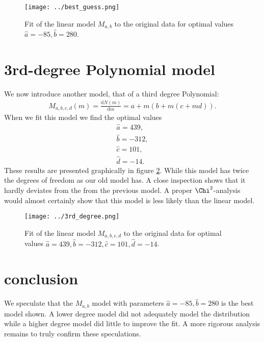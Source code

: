 \documentclass[notitlepage, 12pt, a4paper, twoside, titlepage]{article}
\begin{document}
\begin{figure}[h!]
  \texttt{[image: ../best\_guess.png]}
  \caption{Fit of the linear model $M_{a,b}$ to the original data for optimal values $\hat a = -85, \hat b = 280$.}
  \label{fig:best}
\end{figure}

\section{3rd-degree Polynomial model}
We now introduce another model, that of a third degree Polynomial:
\begin{align}
	M_{a,b,c,d}(m) = \frac{\text{d}N(m)}{\text{d}m} = a + m \left(b + m \left(c+md\right)\right).
\end{align}
 When we fit this model we find the optimal values
 \begin{align}
	 \hat a = 439,\\
	 \hat b = -312,\\
	 \hat c = 101,\\
	 \hat d = -14.
\end{align}
 These results are presented graphically in figure \ref{fig:3rd}.  While this model has twice the degrees of freedom as our old model has. A close inspection shows that it hardly deviates from the
from the previous model. A proper $\Chi^2$-analysis would almost certainly show that this model is less likely than the linear model.

\begin{figure}[h!]
  \texttt{[image: ../3rd\_degree.png]}
  \caption{Fit of the linear model $M_{a,b,c,d}$ to the original data for optimal values $\hat a = 439,	\hat b = -312,	\hat c = 101,	\hat d = -14$.}
  \label{fig:3rd}
\end{figure}

\section{conclusion}

We speculate that the $M_{a,b}$ model with parameters $\hat a = -85, \hat b = 280$ is the best model shown. A lower degree model did not adequately model the distribution while a higher degree model did little to improve the fit. A more rigorous analysis remains to
truly confirm these speculations.
\end{document}
